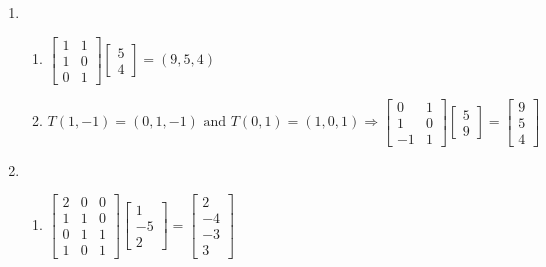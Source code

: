 \documentclass[12pt]{article}
\begin{document}
\begin{enumerate}
  \item

    \begin{enumerate}

      \item $\begin{bmatrix} 1 & 1\\1 & 0\\ 0 &1  \end{bmatrix}\begin{bmatrix} 5\\4\end{bmatrix}=(9,5,4)$

      \item $T(1,-1)=(0,1,-1)\text{ and }T(0,1)=(1,0,1)\Rightarrow \begin{bmatrix} 0 & 1\\1 & 0\\-1 & 1\end{bmatrix}\begin{bmatrix} 5\\9\end{bmatrix}=\begin{bmatrix} 9\\5\\4\end{bmatrix}$

    \end{enumerate}

    \setcounter{enumi}{38}

  \item

    \begin{enumerate}

      \item $\begin{bmatrix}2 & 0 & 0\\ 1 & 1 & 0\\ 0 & 1 & 1\\ 1 & 0 & 1  \end{bmatrix}\begin{bmatrix} 1\\-5\\2\end{bmatrix}=\begin{bmatrix} 2\\-4\\-3\\3\end{bmatrix}$


\end{enumerate}
\end{enumerate}
\end{document}
